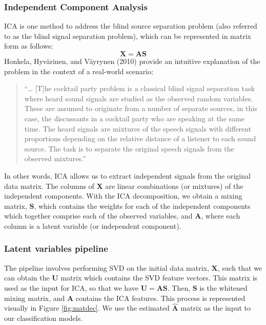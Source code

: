 \documentclass{article}
\begin{document}
\hypertarget{independent-component-analysis}{%
\subsubsection{Independent Component
Analysis}\label{independent-component-analysis}}

ICA is one method to address the blind source separation problem (also
referred to as the blind signal separation problem), which can be
represented in matrix form as follows: \[\mathbf{X = AS}\] Honkela,
Hyvärinen, and Väyrynen (2010) provide an intuitive explanation of the
problem in the context of a real-world scenario:

\begin{quote}
``\ldots{} {[}T{]}he cocktail party problem is a classical blind signal
separation task where heard sound signals are studied as the observed
random variables. These are assumed to originate from a number of
separate sources, in this case, the discussants in a cocktail party who
are speaking at the same time. The heard signals are mixtures of the
speech signals with different proportions depending on the relative
distance of a listener to each sound source. The task is to separate the
original speech signals from the observed mixtures.''
\end{quote}

In other words, ICA allows us to extract independent signals from the
original data matrix. The columns of \(\mathbf{X}\) are linear
combinations (or mixtures) of the independent components. With the ICA
decomposition, we obtain a mixing matrix, \(\mathbf{S}\), which contains
the weights for each of the independent components which together
comprise each of the observed variables, and \(\mathbf{A}\), where each
column is a latent variable (or independent component).

\hypertarget{latent-variables-pipeline}{%
\subsubsection{Latent variables
pipeline}\label{latent-variables-pipeline}}

\label{sec:LVpipe} The pipeline involves performing SVD on the initial
data matrix, \(\mathbf{X}\), such that we can obtain the \(\mathbf{U}\)
matrix which contains the SVD feature vectors. This matrix is used as
the input for ICA, so that we have \(\mathbf{U = AS}\). Then,
\(\mathbf{S}\) is the whitened mixing matrix, and \(\mathbf{A}\)
contains the ICA features. This process is represented visually in
Figure \ref{fig:matdec}. We use the estimated \(\mathbf{\hat{A}}\)
matrix as the input to our classification models.
\end{document}
